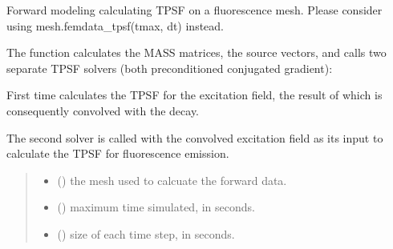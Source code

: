 \documentclass[letterpaper,10pt,english]{sphinxmanual}
\begin{document}
\begin{fulllineitems}
\label{\detokenize{_autosummary/nirfasterff.forward.femdata.femdata_fl_TR:nirfasterff.forward.femdata.femdata_fl_TR}}
\pysigstartsignatures
\pysiglinewithargsret
{}
{\sphinxparamcomma {}\sphinxparamcomma {}\sphinxparamcomma {}\sphinxparamcomma {}\sphinxparamcomma {}\sphinxparamcomma {}}
{}
\pysigstopsignatures
\sphinxAtStartPar
Forward modeling calculating TPSF on a fluorescence mesh. Please consider using mesh.femdata\_tpsf(tmax, dt) instead.

\sphinxAtStartPar
The function calculates the MASS matrices, the source vectors, and calls two separate TPSF solvers (both preconditioned conjugated gradient):

\sphinxAtStartPar
First time calculates the TPSF for the excitation field, the result of which is consequently convolved with the decay.

\sphinxAtStartPar
The second solver is called with the convolved excitation field as its input to calculate the TPSF for fluorescence emission.
\begin{quote}\begin{description}
\begin{itemize}
\item {} 
\sphinxAtStartPar
{} () \textendash{} the mesh used to calcuate the forward data.

\item {} 
\sphinxAtStartPar
{} () \textendash{} maximum time simulated, in seconds.

\item {} 
\sphinxAtStartPar
{} () \textendash{} size of each time step, in seconds.


\end{itemize}
\end{description}
\end{quote}
\end{fulllineitems}
\end{document}
